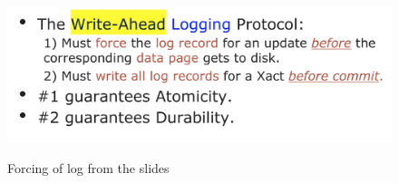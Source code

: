 \begin{figure}[H]
    \centering
    \includegraphics[width=\textwidth]{WAL-SS.png}
    \label{fig:lolslides}
    \caption{Forcing of log from the slides}
\end{figure}
